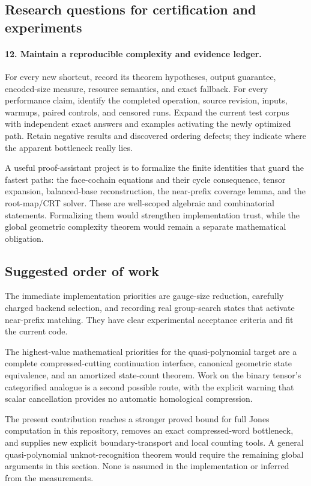 \documentclass[11pt]{article}
\theoremstyle{definition}
\theoremstyle{remark}
\begin{document}
\subsection{Research questions for certification and experiments}

\paragraph{12. Maintain a reproducible complexity and evidence ledger.}
For every new shortcut, record its theorem hypotheses, output guarantee,
encoded-size measure, resource semantics, and exact fallback. For every
performance claim, identify the completed operation, source revision,
inputs, warmups, paired controls, and censored runs. Expand the current
test corpus with independent exact answers and examples activating the
newly optimized path. Retain negative results and discovered ordering
defects; they indicate where the apparent bottleneck really lies.

A useful proof-assistant project is to formalize the finite identities
that guard the fastest paths: the face-cochain equations and their cycle
consequence, tensor expansion, balanced-base reconstruction, the
near-prefix coverage lemma, and the root-map/CRT solver. These are
well-scoped algebraic and combinatorial statements. Formalizing them
would strengthen implementation trust, while the global geometric
complexity theorem would remain a separate mathematical obligation.

\subsection{Suggested order of work}

The immediate implementation priorities are gauge-size reduction,
carefully charged backend selection, and recording real group-search
states that activate near-prefix matching. They have clear experimental
acceptance criteria and fit the current code.

The highest-value mathematical priorities for the quasi-polynomial
target are a complete compressed-cutting continuation interface,
canonical geometric state equivalence, and an amortized state-count
theorem. Work on the binary tensor's categorified analogue is a second
possible route, with the explicit warning that scalar cancellation
provides no automatic homological compression.

The present contribution reaches a stronger proved bound for full Jones
computation in this repository, removes an exact compressed-word
bottleneck, and supplies new explicit boundary-transport and local
counting tools. A general quasi-polynomial unknot-recognition theorem
would require the remaining global arguments in this section. None is
assumed in the implementation or inferred from the measurements.
\end{document}

